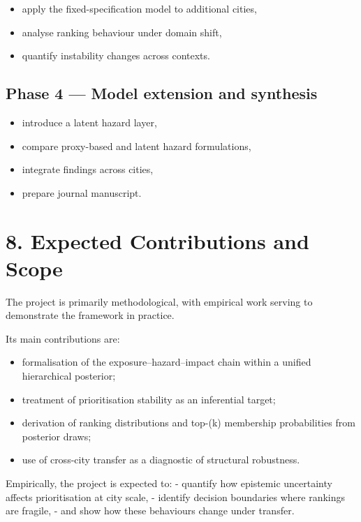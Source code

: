 \documentclass[
]{article}
\providecommand{\tightlist}{%
  \setlength{\itemsep}{0pt}\setlength{\parskip}{0pt}}
\begin{document}
\begin{itemize}
\tightlist
\item
  apply the fixed-specification model to additional cities,
\item
  analyse ranking behaviour under domain shift,
\item
  quantify instability changes across contexts.
\end{itemize}

\subsection{Phase 4 --- Model extension and
synthesis}\label{phase-4-model-extension-and-synthesis}

\begin{itemize}
\tightlist
\item
  introduce a latent hazard layer,
\item
  compare proxy-based and latent hazard formulations,
\item
  integrate findings across cities,
\item
  prepare journal manuscript.
\end{itemize}

\section{8. Expected Contributions and
Scope}\label{expected-contributions-and-scope}

The project is primarily methodological, with empirical work serving to
demonstrate the framework in practice.

Its main contributions are:

\begin{itemize}
\tightlist
\item
  formalisation of the exposure--hazard--impact chain within a unified
  hierarchical posterior;
\item
  treatment of prioritisation stability as an inferential target;
\item
  derivation of ranking distributions and top-(k) membership
  probabilities from posterior draws;
\item
  use of cross-city transfer as a diagnostic of structural robustness.
\end{itemize}

Empirically, the project is expected to: - quantify how epistemic
uncertainty affects prioritisation at city scale, - identify decision
boundaries where rankings are fragile, - and show how these behaviours
change under transfer.
\end{document}

